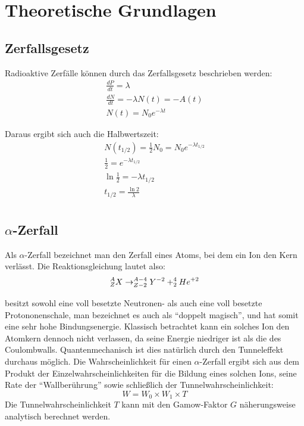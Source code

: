 \section{Theoretische Grundlagen}

\subsection{Zerfallsgesetz}

Radioaktive Zerfälle können durch das Zerfallsgesetz beschrieben werden:
\begin{gather}
 \frac{dP}{dt} = \lambda \\
 \frac{dN}{dt} = - \lambda N(t) = - A(t) \label{dNdtlambdaN}\\
 N(t) = N_0 e^{-\lambda t}
\end{gather}

Daraus ergibt sich auch die Halbwertszeit:
\begin{gather}
 N(t_{1/2}) = \frac{1}{2} N_0 = N_0 e^{-\lambda t_{1/2}} \\
 \frac{1}{2} = e^{-\lambda t_{1/2}} \\
 \ln \frac{1}{2} = - \lambda t_{1/2} \\
 t_{1/2} = \frac{\ln 2}{\lambda} \label{t12ln2lambda}\\
\end{gather}


\subsection{$\alpha$-Zerfall}
Als $\alpha$-Zerfall bezeichnet man den Zerfall eines Atoms, bei dem ein  Ion den Kern verlässt. Die Reaktionsgleichung lautet also:
$$ ^{A}_{Z}{X} \rightarrow ^{A-4}_{Z-2}{Y}^{-2} + ^{4}_{2}{He}^{+2} $$

 besitzt sowohl eine voll besetzte Neutronen- als auch eine voll besetzte Protononenschale, man bezeichnet es auch als "`doppelt magisch"', und hat somit eine sehr hohe Bindungsenergie. Klassisch betrachtet kann ein solches Ion den Atomkern dennoch nicht verlassen, da seine Energie niedriger ist als die des Coulombwalls. Quantenmechanisch ist dies natürlich durch den Tunneleffekt durchaus möglich. Die Wahrscheinlichkeit für einen $\alpha$-Zerfall ergibt sich aus dem Produkt der Einzelwahrscheinlichkeiten für die Bildung eines solchen Ions, seine Rate der "`Wallberührung"' sowie schließlich der Tunnelwahrscheinlichkeit:
$$ W = W_0 \times W_1 \times T $$
Die Tunnelwahrscheinlichkeit $T$ kann mit den Gamow-Faktor $G$ näherungsweise analytisch berechnet werden.


